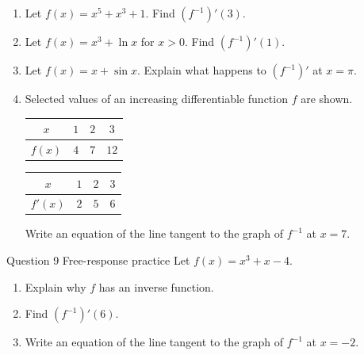 \documentclass[11pt]{article}
\begin{document}
\begin{enumerate}[leftmargin=*,itemsep=2pt,start=5]
  \item Let $f(x)=x^5+x^3+1$. Find $\left(f^{-1}\right)'(3)$.\work{2.8cm}
  \item Let $f(x)=x^3+\ln x$ for $x>0$. Find $\left(f^{-1}\right)'(1)$.\work{2.8cm}
  \item Let $f(x)=x+\sin x$. Explain what happens to $\left(f^{-1}\right)'$ at $x=\pi$.\work{2.8cm}
  \item Selected values of an increasing differentiable function $f$ are shown.\begin{center}\renewcommand{\arraystretch}{1.25}\begin{tabular}{|c|c|c|c|}\hline $x$ & $1$ & $2$ & $3$ \\ \hline $f(x)$ & $4$ & $7$ & $12$ \\ \hline\end{tabular}\end{center}\begin{center}\renewcommand{\arraystretch}{1.25}\begin{tabular}{|c|c|c|c|}\hline $x$ & $1$ & $2$ & $3$ \\ \hline $f'(x)$ & $2$ & $5$ & $6$ \\ \hline\end{tabular}\end{center}Write an equation of the line tangent to the graph of $f^{-1}$ at $x=7$.\work{2.8cm}
\end{enumerate}

\begin{frbox}{Question 9 \textperiodcentered{} Free-response practice}
Let $f(x)=x^3+x-4$.
\begin{enumerate}[label=(\alph*),leftmargin=*,itemsep=2pt]
  \item Explain why $f$ has an inverse function.\work{2.6cm}
  \item Find $\left(f^{-1}\right)'(6)$.\work{2.6cm}
  \item Write an equation of the line tangent to the graph of $f^{-1}$ at $x=-2$.\work{2.6cm}
\end{enumerate}
\end{frbox}
\end{document}
